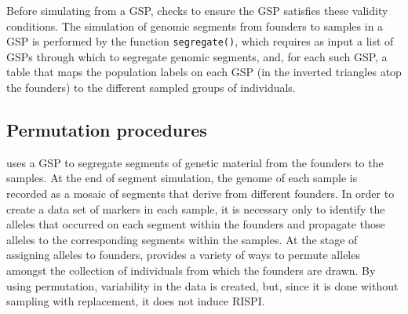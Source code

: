 Before simulating from a GSP, \gscramble{} checks to ensure the GSP
satisfies these validity conditions.  The simulation of genomic segments
from founders to samples in a GSP is performed by the \gscramble{} function
{\footnotesize\tt segregate()}, which requires as input a list of GSPs through which
to segregate genomic segments, and, for each such GSP, a table that maps the
population labels on each GSP (in the inverted triangles atop the founders) to the
different sampled groups of individuals.

\subsection*{Permutation procedures}

\gscramble{} uses a GSP to segregate segments of genetic material from the founders
to the samples.  At the end of segment simulation, the genome of each sample
is recorded as a mosaic of segments that derive from different founders.  In order
to create a data set of markers in each sample, it is necessary only to identify the alleles
that occurred on each segment within the founders and propagate those alleles to the
corresponding segments within the samples.  At the stage of assigning alleles to
founders, \gscramble{} provides a variety of ways to permute alleles amongst
the collection of individuals from which the founders are drawn.  By using permutation,
variability in the data is created, but, since it is done without sampling with replacement, it does
not induce RISPI.

